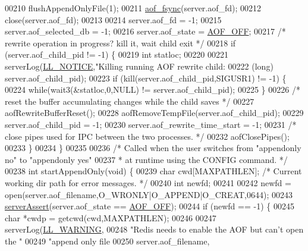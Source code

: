 \begin{DoxyCode}
{00210     flushAppendOnlyFile(1);
00211     \hyperlink{config_8h_af5994c643c434574580bb7816af82cad}{aof\_fsync}(server.aof\_fd);
00212     close(server.aof\_fd);
00213 
00214     server.aof\_fd = -1;
00215     server.aof\_selected\_db = -1;
00216     server.aof\_state = \hyperlink{server_8h_a5226306fbcebcb6d5d02e0fef3c213c2}{AOF\_OFF};
00217     \textcolor{comment}{/* rewrite operation in progress? kill it, wait child exit */}
00218     \textcolor{keywordflow}{if} (server.aof\_child\_pid != -1) \{
00219         \textcolor{keywordtype}{int} statloc;
00220 
00221         serverLog(\hyperlink{server_8h_a8c54c191e436c7dd3012167212692401}{LL\_NOTICE},\textcolor{stringliteral}{"Killing running AOF rewrite child: %
00222             (\textcolor{keywordtype}{long}) server.aof\_child\_pid);
00223         \textcolor{keywordflow}{if} (kill(server.aof\_child\_pid,SIGUSR1) != -1) \{
00224             \textcolor{keywordflow}{while}(wait3(&statloc,0,NULL) != server.aof\_child\_pid);
00225         \}
00226         \textcolor{comment}{/* reset the buffer accumulating changes while the child saves */}
00227         aofRewriteBufferReset();
00228         aofRemoveTempFile(server.aof\_child\_pid);
00229         server.aof\_child\_pid = -1;
00230         server.aof\_rewrite\_time\_start = -1;
00231         \textcolor{comment}{/* close pipes used for IPC between the two processes. */}
00232         aofClosePipes();
00233     \}
00234 \}
00235 
00236 \textcolor{comment}{/* Called when the user switches from "appendonly no" to "appendonly yes"}
00237 \textcolor{comment}{ * at runtime using the CONFIG command. */}
00238 \textcolor{keywordtype}{int} startAppendOnly(\textcolor{keywordtype}{void}) \{
00239     \textcolor{keywordtype}{char} cwd[MAXPATHLEN]; \textcolor{comment}{/* Current working dir path for error messages. */}
00240     \textcolor{keywordtype}{int} newfd;
00241 
00242     newfd = open(server.aof\_filename,O\_WRONLY|O\_APPEND|O\_CREAT,0644);
00243     \hyperlink{server_8h_a88114b5169b4c382df6b56506285e56a}{serverAssert}(server.aof\_state == \hyperlink{server_8h_a5226306fbcebcb6d5d02e0fef3c213c2}{AOF\_OFF});
00244     \textcolor{keywordflow}{if} (newfd == -1) \{
00245         \textcolor{keywordtype}{char} *cwdp = getcwd(cwd,MAXPATHLEN);
00246 
00247         serverLog(\hyperlink{server_8h_a31229b9334bba7d6be2a72970967a14b}{LL\_WARNING},
00248             \textcolor{stringliteral}{"Redis needs to enable the AOF but can't open the "}
00249             \textcolor{stringliteral}{"append only file %
00250             server.aof\_filename,
}}}
\end{DoxyCode}
